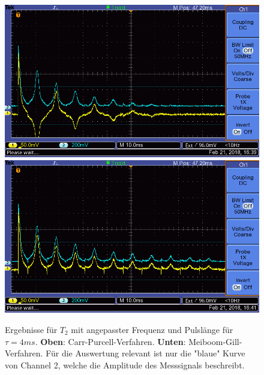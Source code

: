 \documentclass[12pt,a4paper]{article}
\begin{document}
\begin{figure}
\centering
\includegraphics[scale=0.8]{Bilder/T2CPalt.png}
\includegraphics[scale=0.8]{Bilder/T2MGalt.png}
\caption{Ergebnisse für $T_2$ mit angepasster Frequenz und Pulslänge für $\tau = 4ms$. \textbf{Oben}: Carr-Purcell-Verfahren. \textbf{Unten}: Meiboom-Gill-Verfahren. Für die Auswertung relevant ist nur die "blaue" Kurve von Channel 2, welche die Amplitude des Messsignals beschreibt.}
\label{fig:T2Datenalt}
\end{figure}
\end{document}
